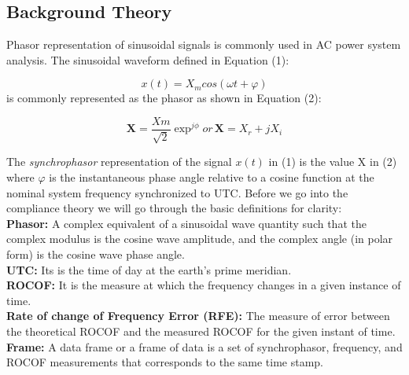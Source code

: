 \subsection{Background Theory}
Phasor representation of sinusoidal signals is commonly used in AC power system analysis. The sinusoidal waveform defined in Equation (1):

\begin{equation}
x(t) = X_m cos(\omega t + \varphi)
\end{equation}
is commonly represented as the phasor as shown in Equation (2):

\begin{equation}
\textbf{X} = \frac{Xm}{\sqrt{2}}\exp^{j\phi}
or\hspace{2pt} \textbf{X} = X_r+jX_i
\end{equation}

The \textit{synchrophasor} representation of the signal $x(t)$ in (1) is the value X in (2) where $\varphi$ is the instantaneous phase angle relative to a cosine function at the nominal system frequency synchronized to UTC. Before we go into the compliance theory we will go through the basic definitions for clarity:\\
\textbf{Phasor:} A complex equivalent of a sinusoidal wave quantity such that the complex modulus is the cosine wave amplitude, and the complex angle (in polar form) is the cosine wave phase angle.\\
\textbf{UTC:} Its is the time of day at the earth's prime meridian.\\
\textbf{ROCOF:} It is the measure at which the frequency changes in a given instance of time.\\
\textbf{Rate of change of Frequency Error (RFE):} The measure of error between the theoretical ROCOF and the measured ROCOF for the given instant of time.\\
\textbf{Frame:} A data frame or a frame of data is a set of synchrophasor, frequency, and ROCOF measurements that corresponds to the same time stamp.\\